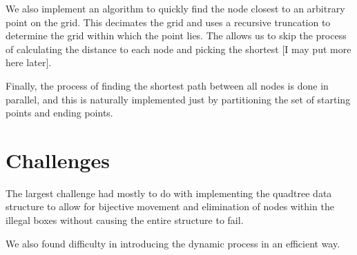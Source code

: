 \documentclass[10pt, letterpaper]{geneassignment}
\begin{document}
		We also implement an algorithm to quickly find the node 	closest to an arbitrary point on the grid. This decimates the grid and uses a recursive truncation to determine the grid within which the point lies. The allows us to skip the process of calculating the distance to each node and picking the shortest [I may put more here later].
		
		Finally, the process of finding the shortest path between all 	nodes is done in parallel, and this is naturally implemented just by partitioning the set of starting points and ending points.
		
	\section{Challenges}
		The largest challenge had mostly to do with implementing the 	quadtree data structure to allow for bijective movement and elimination of nodes within the illegal boxes without causing the entire structure to fail.
		
		We also found difficulty in introducing the dynamic process in an efficient way.
	
	
\end{document}
